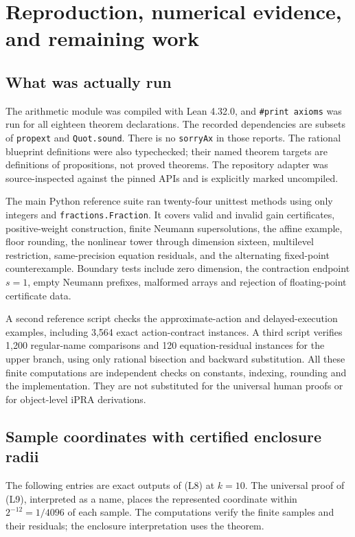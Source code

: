 \section{Reproduction, numerical evidence, and remaining work}
\label{sec:validation}

\subsection{What was actually run}

The arithmetic module was compiled with Lean 4.32.0, and
\texttt{\#print axioms} was run for all eighteen theorem declarations.
The recorded dependencies are subsets of \texttt{propext} and
\texttt{Quot.sound}. There is no \texttt{sorryAx} in those reports.
The rational blueprint definitions were also typechecked; their
named theorem targets are definitions of propositions, not proved
theorems. The repository adapter was source-inspected against the
pinned APIs and is explicitly marked uncompiled.

The main Python reference suite ran twenty-four unittest methods
using only integers and \texttt{fractions.Fraction}. It covers
valid and invalid gain certificates, positive-weight construction,
finite Neumann supersolutions, the affine example, floor rounding,
the nonlinear tower through dimension sixteen, multilevel
restriction, same-precision equation residuals, and the alternating
fixed-point counterexample. Boundary tests include zero dimension,
the contraction endpoint \(s=1\), empty Neumann prefixes,
malformed arrays and rejection of floating-point certificate data.

A second reference script checks the approximate-action and
delayed-execution examples, including 3,564 exact action-contract
instances. A third script verifies 1,200 regular-name comparisons
and 120 equation-residual instances for the upper branch, using
only rational bisection and backward substitution. All these finite
computations are independent checks on
constants, indexing, rounding and the implementation. They are
not substituted for the universal human proofs or for object-level
iPRA derivations.

\subsection{Sample coordinates with certified enclosure radii}

The following entries are exact outputs of (L8) at \(k=10\).
The universal proof of (L9), interpreted as a name, places the
represented coordinate within \(2^{-12}=1/4096\) of each sample.
The computations verify the finite samples and their residuals;
the enclosure interpretation uses the theorem.

